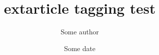 \documentclass{extarticle}
\title{extarticle tagging test}
\author{Some author}
\date{Some date}
\begin{document}
\maketitle
\tableofcontents
\blinddocument
\end{document}
